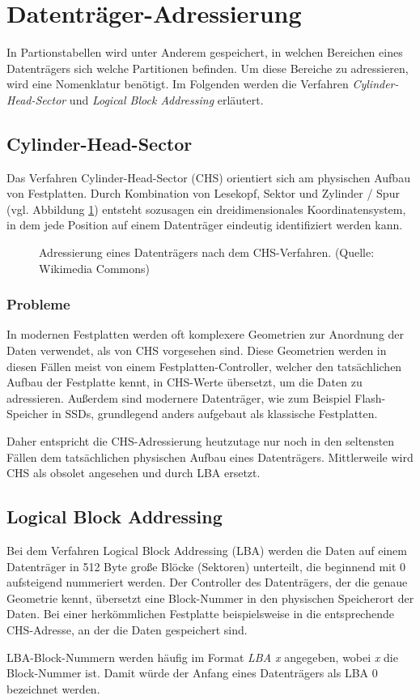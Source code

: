 \section{Datenträger-Adressierung}
\label{sec:addressing}
In Partionstabellen wird unter Anderem gespeichert, in welchen Bereichen eines Datenträgers sich welche Partitionen befinden.
Um diese Bereiche zu adressieren, wird eine Nomenklatur benötigt.
Im Folgenden werden die Verfahren \textit{Cylinder-Head-Sector} und \textit{Logical Block Addressing} erläutert.

\subsection{Cylinder-Head-Sector}
Das Verfahren Cylinder-Head-Sector (CHS) orientiert sich am physischen Aufbau von Festplatten.
Durch Kombination von Lesekopf, Sektor und Zylinder / Spur (vgl. Abbildung \ref{fig:chs}) entsteht sozusagen ein dreidimensionales Koordinatensystem, in dem jede Position auf einem Datenträger eindeutig identifiziert werden kann.

\begin{figure}[ht]
    \centering
    \fbox{}
    \caption{Adressierung eines Datenträgers nach dem CHS-Verfahren. (Quelle: Wikimedia Commons)}
    \label{fig:chs}
\end{figure}

\subsubsection{Probleme}
In modernen Festplatten werden oft komplexere Geometrien zur Anordnung der Daten verwendet, als von CHS vorgesehen sind.
Diese Geometrien werden in diesen Fällen meist von einem Festplatten-Controller, welcher den tatsächlichen Aufbau der Festplatte kennt, in CHS-Werte übersetzt, um die Daten zu adressieren.\cite{pollard2011}
Außerdem sind modernere Datenträger, wie zum Beispiel Flash-Speicher in SSDs, grundlegend anders aufgebaut als klassische Festplatten.

Daher entspricht die CHS-Adressierung heutzutage nur noch in den seltensten Fällen dem tatsächlichen physischen Aufbau eines Datenträgers. 
Mittlerweile wird CHS als obsolet angesehen und durch LBA ersetzt.


\subsection{Logical Block Addressing}
\label{sec:addressing:lba}
Bei dem Verfahren Logical Block Addressing (LBA) werden die Daten auf einem Datenträger in 512 Byte große Blöcke (Sektoren) unterteilt, die beginnend mit 0 aufsteigend nummeriert werden.
Der Controller des Datenträgers, der die genaue Geometrie kennt, übersetzt eine Block-Nummer in den physischen Speicherort der Daten.
Bei einer herkömmlichen Festplatte beispielsweise in die entsprechende CHS-Adresse, an der die Daten gespeichert sind.

LBA-Block-Nummern werden häufig im Format \textit{LBA x} angegeben, wobei \textit{x} die Block-Nummer ist.
Damit würde der Anfang eines Datenträgers als LBA 0 bezeichnet werden.
